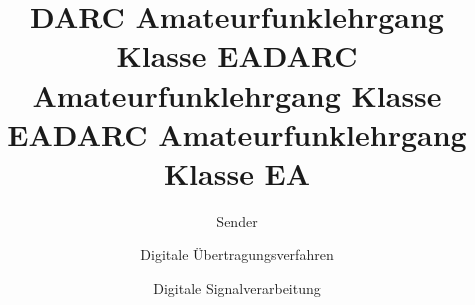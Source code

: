 \documentclass[aspectratio = 169]{beamer}
\begin{document}
\title{DARC Amateurfunklehrgang Klasse EA}
\author{Sender}
\begin{frame}
\maketitle
\end{frame}














\title{DARC Amateurfunklehrgang Klasse EA}
\author{Digitale Übertragungsverfahren}
\begin{frame}
\maketitle
\end{frame}
























\title{DARC Amateurfunklehrgang Klasse EA}
\author{Digitale Signalverarbeitung}
\begin{frame}
\maketitle
\end{frame}














\end{document}
